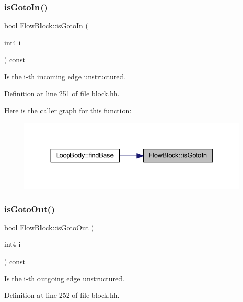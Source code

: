 \subsubsection{\texorpdfstring{isGotoIn()}{isGotoIn()}}
{\footnotesize\ttfamily bool Flow\+Block\+::is\+Goto\+In (\begin{DoxyParamCaption}\item[{int4}]{i }\end{DoxyParamCaption}) const\hspace{0.3cm}{\ttfamily [inline]}}



Is the i-\/th incoming edge unstructured. 



Definition at line 251 of file block.\+hh.

Here is the caller graph for this function\+:
\nopagebreak
\begin{figure}[H]
\begin{center}
\leavevmode
\includegraphics[width=324pt]{class_flow_block_aabe712161d0f64bcf0a8f98329b19419_icgraph}
\end{center}
\end{figure}
\mbox{\label{class_flow_block_a338b6b77d5b3e19d7393cc0e8baf5f26}} 
\subsubsection{\texorpdfstring{isGotoOut()}{isGotoOut()}}
{\footnotesize\ttfamily bool Flow\+Block\+::is\+Goto\+Out (\begin{DoxyParamCaption}\item[{int4}]{i }\end{DoxyParamCaption}) const\hspace{0.3cm}{\ttfamily [inline]}}



Is the i-\/th outgoing edge unstructured. 



Definition at line 252 of file block.\+hh.

